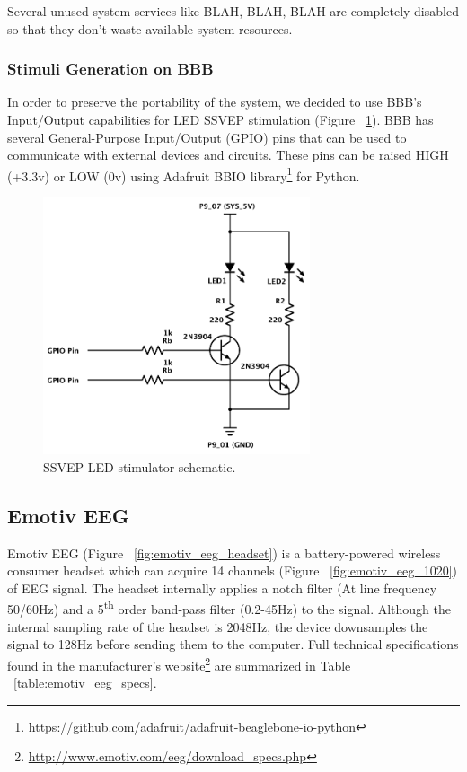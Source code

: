 \documentclass[12pt]{article}
\newcommand\mysubsection[1]{\subsection{#1}}
\newcommand\mysubsubsection[1]{\subsubsection{#1}}
\numberwithin{equation}{section}
\numberwithin{figure}{section}
\numberwithin{table}{section}
\begin{document}
\par{
Several unused system services like BLAH, BLAH, BLAH are completely disabled so that they don't waste available system resources.
}

\mysubsubsection{Stimuli Generation on BBB}\label{seq:embeddedcomputer_stimuligen}
\par{
}
\par{
    In order to preserve the portability of the system, we decided to use BBB's
    Input/Output capabilities for LED SSVEP stimulation (Figure ~\ref{fig:bbb_led_schema}).
    BBB has several General-Purpose Input/Output (GPIO) pins that can be used to communicate with external
    devices and circuits. These pins can be raised HIGH (+3.3v) or LOW (0v)
    using Adafruit BBIO library\footnote{\url{https://github.com/adafruit/adafruit-beaglebone-io-python}} for Python.
}

\begin{figure}[ht]
    \centering
    \includegraphics[width=0.7\textwidth]{images/led_circuit}
    \caption{SSVEP LED stimulator schematic.}
    \label{fig:bbb_led_schema}
\end{figure}

\mysubsection{Emotiv EEG}\label{seq:emotiveeg}

\par{
    Emotiv EEG (Figure ~\ref{fig:emotiv_eeg_headset}) is a battery-powered wireless consumer headset which can
    acquire 14 channels (Figure ~\ref{fig:emotiv_eeg_1020}) of EEG signal. The headset internally applies a
    notch filter (At line frequency 50/60Hz) and a 5\textsuperscript{th} order band-pass filter (0.2-45Hz)
    to the signal. Although the internal sampling rate of the headset is 2048Hz, the device
    downsamples the signal to 128Hz before sending them to the computer. Full technical specifications found in the
    manufacturer's website\footnote{\url{http://www.emotiv.com/eeg/download_specs.php}} are summarized in Table ~\ref{table:emotiv_eeg_specs}.
}
\end{document}
